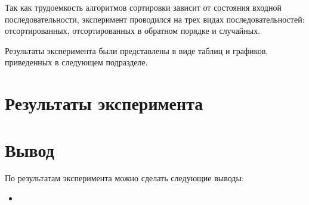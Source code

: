 Так как трудоемкость алгоритмов сортировки зависит от состояния входной последовательности, эксперимент проводился на трех видах последовательностей: отсортированных, отсортированных в обратном порядке и случайных.

Результаты эксперимента были представлены в виде таблиц и графиков, приведенных в следующем подразделе.

\section{Результаты эксперимента}

\section{Вывод}

По результатам эксперимента можно сделать следующие выводы:
\begin{itemize}[left=\parindent]
        \item
\end{itemize}

